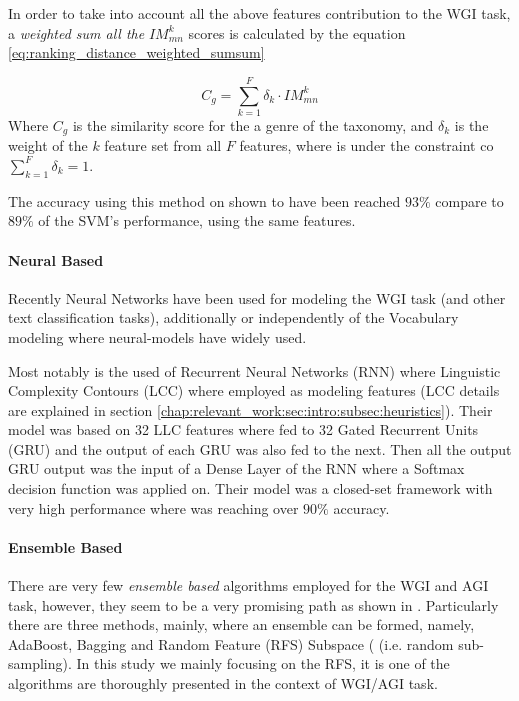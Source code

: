 In order to take into account all the above features contribution to the WGI task, a \textit{weighted sum all the} $IM^{k}_{mn}$ scores is calculated by the equation \ref{eq:ranking_distance_weighted_sumsum}

\begin{equation}\label{eq:ranking_distance_weighted_sumsum}
	C_{g} = \sum_{k=1}^{F} \delta_{k} \cdot IM_{mn}^{k}
\end{equation}
Where $C_{g}$ is the similarity score for the a genre of the taxonomy, and $\delta_{k}$ is the weight of the $k$ feature set from all $F$ features, where is under the constraint co $\sum_{k=1}^{F} \delta_{k} = 1$.

The accuracy using this method on shown to have been reached $93\%$ compare to $89\%$ of the SVM's performance, using the same features.


\paragraph{Neural Based} Recently Neural Networks have been used for modeling the WGI task (and other text classification tasks), additionally or independently of the Vocabulary modeling where neural-models have widely used. 

Most notably is the used of Recurrent Neural Networks (RNN) where Linguistic Complexity Contours (LCC) where employed as modeling features (LCC details are explained in section \ref{chap:relevant_work:sec:intro:subsec:heuristics}). Their model was based on 32 LLC features where fed to 32 Gated Recurrent Units (GRU)  and the output of each GRU was also fed to the next. Then all the output GRU output was the input of a Dense Layer of the RNN where a Softmax decision function was applied on. Their model was a closed-set framework with very high performance where was reaching over $90\%$  accuracy\parencite{strobel2018text}.

\paragraph{Ensemble Based} There are very few \textit{ensemble based} algorithms employed for the WGI and AGI task, however, they seem to be a very promising path as shown in \parencite{onan2018ensemble,pritsos2015clef,pritsos2013open,pritsos2018open}. Particularly there are three methods, mainly, where an ensemble can be formed, namely, AdaBoost, Bagging and Random Feature (RFS) Subspace ( (i.e. random sub-sampling). In this study we mainly focusing on the RFS, it is one of the algorithms are thoroughly presented in the context of WGI/AGI task.


